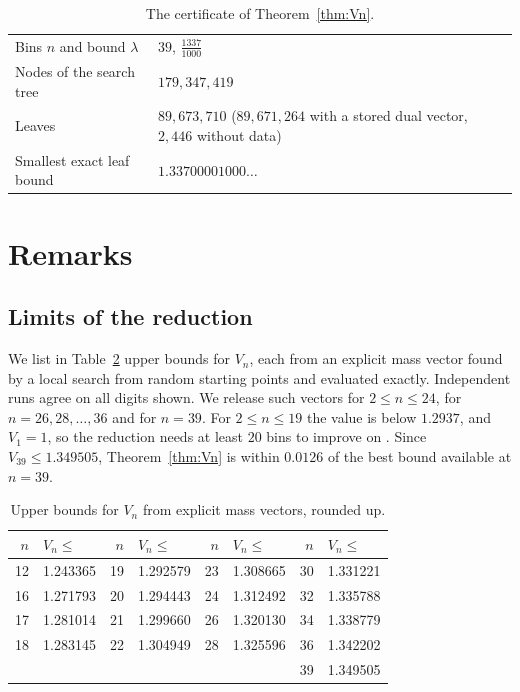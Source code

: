 \documentclass[11pt]{amsart}
\theoremstyle{definition}
\theoremstyle{remark}
\numberwithin{equation}{section}
\newcommand{\LAM}{\tfrac{1337}{1000}}
\newcommand{\Nbins}{39}
\newcommand{\Nleaves}{89{,}673{,}710}
\newcommand{\NleavesD}{89{,}671{,}264}
\newcommand{\NleavesU}{2{,}446}
\newcommand{\Nnodes}{179{,}347{,}419}
\newcommand{\MinLeaf}{1.33700001000\ldots}
\begin{document}
\begin{table}[ht]
\centering
\caption{The certificate of Theorem~\ref{thm:Vn}.}\label{tab:cert}
\small
\begin{tabular}{@{}lp{}@{}}
\toprule
Bins $n$ and bound $\lambda$ & $\Nbins$, $\LAM$\\
Nodes of the search tree & $\Nnodes$\\
Leaves & $\Nleaves$ ($\NleavesD$ with a stored dual vector, $\NleavesU$ without data)\\
Smallest exact leaf bound & $\MinLeaf$\\
\bottomrule
\end{tabular}
\end{table}

\section{Remarks}\label{sec:remarks}

\subsection*{Limits of the reduction} We list in Table~\ref{tab:Vn} upper bounds for $V_n$, each from an explicit mass vector found by a local search from random starting points and evaluated exactly. Independent runs agree on all digits shown. We release such vectors for $2\le n\le24$, for $n=26,28,\dots,36$ and for $n=39$. For $2\le n\le19$ the value is below $1.2937$, and $V_1=1$, so the reduction needs at least $20$ bins to improve on \cite{KP26}. Since $V_{39}\le1.349505$, Theorem~\ref{thm:Vn} is within $0.0126$ of the best bound available at $n=39$.

\begin{table}[ht]
\centering
\caption{Upper bounds for $V_n$ from explicit mass vectors, rounded up.}\label{tab:Vn}
\begin{tabular}{@{}rlrlrlrl@{}}
\toprule
$n$ & $V_n\le$ & $n$ & $V_n\le$ & $n$ & $V_n\le$ & $n$ & $V_n\le$\\
\midrule
12 & 1.243365 & 19 & 1.292579 & 23 & 1.308665 & 30 & 1.331221\\
16 & 1.271793 & 20 & 1.294443 & 24 & 1.312492 & 32 & 1.335788\\
17 & 1.281014 & 21 & 1.299660 & 26 & 1.320130 & 34 & 1.338779\\
18 & 1.283145 & 22 & 1.304949 & 28 & 1.325596 & 36 & 1.342202\\
 & & & & & & 39 & 1.349505\\
\bottomrule
\end{tabular}
\end{table}
\end{document}
